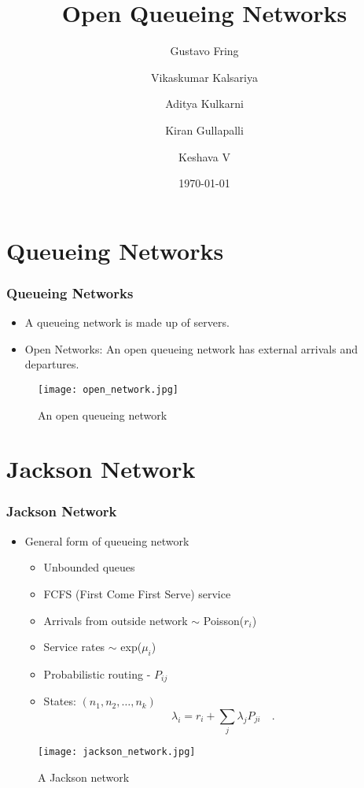 \documentclass[10pt,notes]{beamer}
\title{Open Queueing Networks}
\author{Gustavo Fring \and Vikaskumar Kalsariya \and Aditya Kulkarni \and Kiran Gullapalli \and Keshava V}
\date{\today}
\begin{document}
\begin{frame}
    \titlepage
\end{frame}

\begin{frame}
    \tableofcontents
\end{frame}

\section{Queueing Networks}

\begin{frame}
    \frametitle{Queueing Networks}
    \begin{itemize}
        \item A queueing network is made up of servers.
        \item Open Networks: An open queueing network has external arrivals and departures.
    \end{itemize}
    \begin{figure}
        \texttt{[image: open\_network.jpg]}
        \caption{An open queueing network}
    \end{figure}
\end{frame}


\section{Jackson Network}

\begin{frame}
    \frametitle{Jackson Network}
    \begin{itemize}
        \item General form of queueing network
        \begin{itemize}
            \item Unbounded queues
            \item FCFS (First Come First Serve) service
            \item Arrivals from outside network \(\sim\) Poisson(\(r_i\))
            \item Service rates \(\sim\) exp(\(\mu_i\))
            \item Probabilistic routing - \(P_{ij}\)
            \item States: \((n_1, n_2, \ldots, n_k)\)
            $$ \lambda_i = r_i + \sum_j \lambda_j P_{ji} \quad \text{.} $$
        
        \end{itemize}
    \end{itemize}
        \begin{figure}
        \texttt{[image: jackson\_network.jpg]}
        \caption{A Jackson network}
    \end{figure}
\end{frame}
\end{document}

